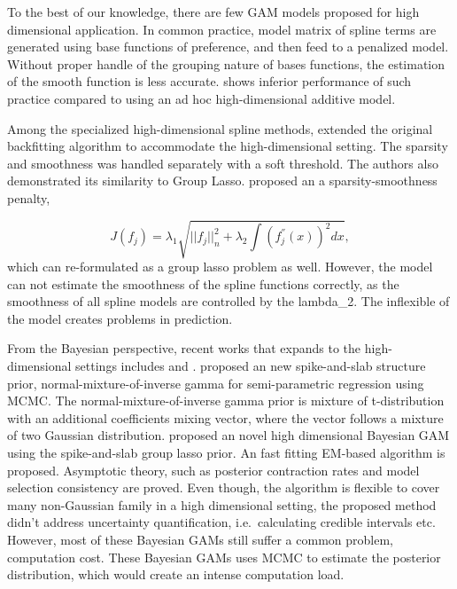\documentclass[AMA,STIX1COL,]{WileyNJD-v2}
\begin{document}
To the best of our knowledge, there are few GAM models proposed for high
dimensional application. In common practice, model matrix of spline
terms are generated using base functions of preference, and then feed to
a penalized model. Without proper handle of the grouping nature of bases
functions, the estimation of the smooth function is less accurate.
\citet{Bai2020Spline} shows inferior performance of such practice
compared to using an ad hoc high-dimensional additive model.

Among the specialized high-dimensional spline methods,
\citet{Ravikumar2009} extended the original backfitting algorithm
\citep{Hastie1987} to accommodate the high-dimensional setting. The
sparsity and smoothness was handled separately with a soft threshold.
The authors also demonstrated its similarity to Group Lasso.
\citet{Meier2009} proposed an a sparsity-smoothness penalty,

\[
J(f_j) = \lambda_1 \sqrt{||f_j||^2_n + \lambda_2 \int(f^{''}_j(x))^2dx},
\] which can re-formulated as a group lasso problem as well. However,
the model can not estimate the smoothness of the spline functions
correctly, as the smoothness of all spline models are controlled by the
lambda\_2. The inflexible of the model creates problems in prediction.

From the Bayesian perspective, recent works that expands to the
high-dimensional settings includes \citet{Scheipl2012} and
\citet{Bai2020Spline}. \citet{Scheipl2012} proposed an new
spike-and-slab structure prior, normal-mixture-of-inverse gamma for
semi-parametric regression using MCMC. The normal-mixture-of-inverse
gamma prior is mixture of t-distribution with an additional coefficients
mixing vector, where the vector follows a mixture of two Gaussian
distribution. \citet{Bai2020Spline} proposed an novel high dimensional
Bayesian GAM using the spike-and-slab group lasso prior. An fast fitting
EM-based algorithm is proposed. Asymptotic theory, such as posterior
contraction rates and model selection consistency are proved. Even
though, the algorithm is flexible to cover many non-Gaussian family in a
high dimensional setting, the proposed method didn't address uncertainty
quantification, i.e.~calculating credible intervals etc. However, most
of these Bayesian GAMs still suffer a common problem, computation cost.
These Bayesian GAMs uses MCMC to estimate the posterior distribution,
which would create an intense computation load.
\end{document}
